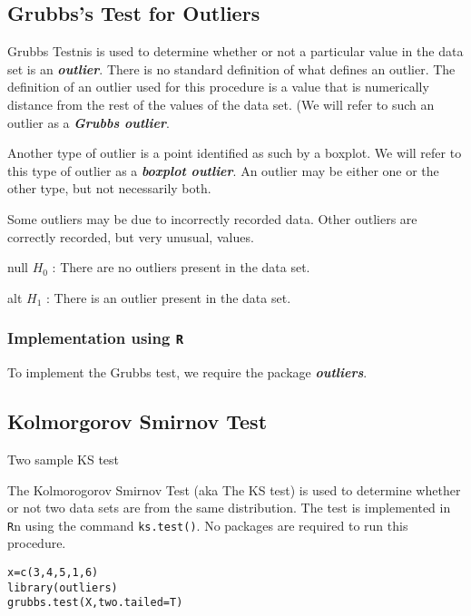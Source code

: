 \documentclass[12pt]{article} %
\begin{document}
\subsection{Grubbs's Test for Outliers}
Grubbs Testnis is used to determine whether or not a particular value in the data set is an \textbf{\textit{outlier}}. There is no standard definition of what defines an outlier. The definition of an outlier used for this procedure is a value that is numerically distance from the rest of the values of the data set. (We will refer to such an outlier as a \textbf{\textit{Grubbs outlier}}.


Another type of outlier is a point identified as such by a boxplot. We will refer to this type of outlier as a \textbf{\textit{boxplot outlier}}.  An outlier may be either one or the other type, but not necessarily both.

Some outliers may be due to incorrectly recorded data. Other outliers are correctly recorded, but very unusual, values.

null $H_0$ : There are no outliers present in the data set.

alt $H_1$ : There is an outlier present in the data set.

\subsubsection{Implementation using \texttt{R}}
To implement the Grubbs test, we require the package \textbf{\textit{outliers}}.

\subsection{Kolmorgorov Smirnov Test}
Two sample KS test

The Kolmorogorov Smirnov Test (aka The KS test) is used to determine whether or not two data sets are from the same distribution.
The test is implemented in \texttt{R}n using the command \texttt{ks.test()}. No packages are required to run this procedure.




\begin{framed}
\begin{verbatim}
x=c(3,4,5,1,6)
library(outliers)
grubbs.test(X,two.tailed=T)
\end{verbatim}
\end{framed}


\newpage
\end{document}
